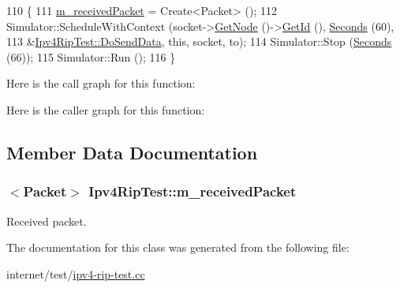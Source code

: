 \begin{DoxyCode}
110 \{
111   \hyperlink{classIpv4RipTest_a969090f8d2149a45580720b064fe75de}{m\_receivedPacket} = Create<Packet> ();
112   Simulator::ScheduleWithContext (socket->\hyperlink{classns3_1_1Socket_aba642ad4301c1df47befc0aa9afa2e48}{GetNode} ()->\hyperlink{classns3_1_1Node_aaf49b64a843565ce3812326313b370ac}{GetId} (), 
      \hyperlink{group__timecivil_ga33c34b816f8ff6628e33d5c8e9713b9e}{Seconds} (60),
113                                   &\hyperlink{classIpv4RipTest_af38195cc9083fa17f5c25382bb42ce98}{Ipv4RipTest::DoSendData}, \textcolor{keyword}{this}, socket, to);
114   Simulator::Stop (\hyperlink{group__timecivil_ga33c34b816f8ff6628e33d5c8e9713b9e}{Seconds} (66));
115   Simulator::Run ();
116 \}
\end{DoxyCode}


Here is the call graph for this function\+:




Here is the caller graph for this function\+:




\subsection{Member Data Documentation}
\subsubsection[{\texorpdfstring{m\+\_\+received\+Packet}{m_receivedPacket}}]{$<${\bf Packet}$>$ Ipv4\+Rip\+Test\+::m\+\_\+received\+Packet\hspace{0.3cm}{\ttfamily [private]}}\hypertarget{classIpv4RipTest_a969090f8d2149a45580720b064fe75de}{}\label{classIpv4RipTest_a969090f8d2149a45580720b064fe75de}


Received packet. 



The documentation for this class was generated from the following file\+:\begin{DoxyCompactItemize}
\item 
internet/test/\hyperlink{ipv4-rip-test_8cc}{ipv4-\/rip-\/test.\+cc}\end{DoxyCompactItemize}
